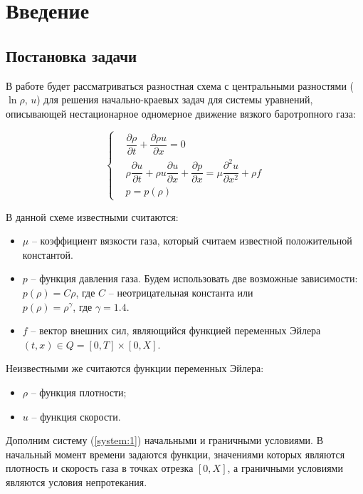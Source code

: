 \section{Введение}

\subsection{Постановка задачи}

В работе будет рассматриваться разностная схема с центральными разностями ($\ln{\rho}$, $u$) для решения начально-краевых задач для системы уравнений, описывающей нестационарное одномерное движение вязкого баротропного газа:

\begin{equation}
\label{system:1}
\left\{
 \begin{aligned}
  & \dfrac{\partial \rho}{\partial t} 
    + \dfrac{\partial \rho u}{\partial x} 
    = 0 \\
  & \rho \dfrac{\partial u}{\partial t} 
    + \rho u \dfrac{\partial u}{\partial x} 
    + \dfrac {\partial p} {\partial x} 
    = \mu \dfrac{\partial^{2} u}{\partial x ^{2}} 
    + \rho f \\
  & p = p (\rho)
 \end{aligned}
\right.
\end{equation}

\bigskip
В данной схеме известными считаются:
\begin{itemize}
	\item $\mu$ -- коэффициент вязкости газа, который считаем известной поло­жительной константой.
	\item $p$ -- функция давления газа.
	Будем использовать две возможные зависимости: \\
	$p(\rho) = C\rho$, где $C$ -- неотрицательная константа или \\
	$p(\rho) = \rho ^{\gamma}$, где $\gamma = 1.4$.
	\item $f$ -- вектор внешних сил, являющийся функцией переменных Эйлера 
	$(t,x) \in Q = [0,T] \times [0,X]$.
\end{itemize}

Неизвестными же считаются функции переменных Эйлера:
\begin{itemize}
	\item $\rho$ -- функция плотности;
	\item $u$ -- функция скорости.
\end{itemize}

Дополним систему (\ref{system:1}) начальными и граничными условиями.
В начальный момент времени задаются функции, значениями которых являются плотность и скорость газа в точках отрезка $[0, X]$, а граничными условиями являются условия непротекания.

